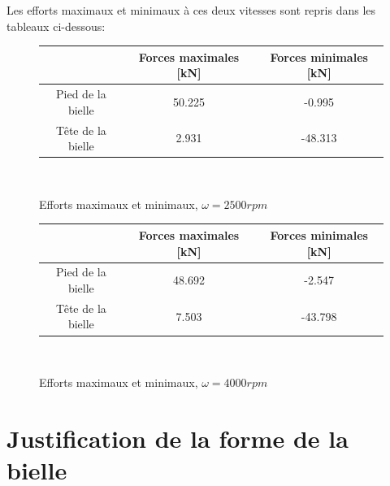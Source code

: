 \documentclass[a4paper,oneside,12pt]{report}
\begin{document}
Les efforts maximaux et minimaux à ces deux vitesses sont repris dans les tableaux ci-dessous: \\

\begin{figure}[h!]
\begin{center}
\begin{tabular}{|c||c|c|}
\hline 
\ & Forces maximales [kN] & Forces minimales [kN] \\ 
\hline 
Pied de la bielle & 50.225 & -0.995 \\ 
\hline 
Tête de la bielle & 2.931 & -48.313 \\ 
\hline 
\end{tabular} \\
\end{center}
\caption{Efforts maximaux et minimaux, $\omega=2500rpm$}
\end{figure}

\begin{figure}[h!]
\begin{center}
\begin{tabular}{|c||c|c|}
\hline 
\ & Forces maximales [kN] & Forces minimales [kN] \\ 
\hline 
Pied de la bielle & 48.692 & -2.547 \\ 
\hline 
Tête de la bielle &  7.503 & -43.798 \\ 
\hline 
\end{tabular} \\
\caption{Efforts maximaux et minimaux, $\omega=4000rpm$}
\end{center}
\end{figure}

\section{Justification de la forme de la bielle}
\end{document}
